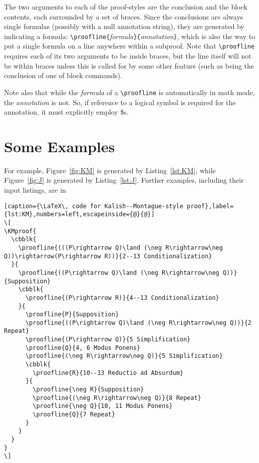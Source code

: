 \documentclass{article}
\begin{document}
The two arguments to each of the proof-styles are the conclusion and the block contents, each surrounded by a set of braces.  Since the conclusions are always single formulas (possibly with a null annotation string), they are generated by indicating a formula: \verb+\proofline{+\emph{formula}\verb+}{+\emph{annotation}\verb+}+, which is also the way to put a single formula on a line anywhere within a subproof.  Note that \verb+\proofline+ requires each of its two arguments to be inside braces, but the line itself will not be within braces unless this is called for by some other feature (such as being the conclusion of one of block commands).

Note also that while the \emph{formula} of a \verb+\proofline+ is automatically in math mode, the \emph{annotation} is not.  So, if reference to a logical symbol is required for the annotation, it must explicitly employ \$s.

\section{Some Examples}
For example, Figure~\ref{fig:KM} is generated by Listing~\ref{lst:KM}, while Figure~\ref{fig:J} is generated by Listing~\ref{lst:J}.  Further examples, including their input listings, are in {\color{red}{the other paper, again -- link to JasKMnatded.pdf}}

\begin{lstlisting}[caption={\LaTeX\, code for Kalish--Montague-style proof},label={lst:KM},numbers=left,escapeinside={@}{@}]
\[
\KMproof{
  \cbblk{  
  	\proofline{(((P\rightarrow Q)\land (\neg R\rightarrow\neg Q))\rightarrow(P\rightarrow R))}{2--13 Conditionalization}
  }{
    \proofline{((P\rightarrow Q)\land (\neg R\rightarrow\neg Q))}{Supposition}   
    \cbblk{
      \proofline{(P\rightarrow R)}{4--13 Conditionalization}
    }{
      \proofline{P}{Supposition}
      \proofline{((P\rightarrow Q)\land (\neg R\rightarrow\neg Q))}{2 Repeat}
      \proofline{(P\rightarrow Q)}{5 Simplification}
      \proofline{Q}{4, 6 Modus Ponens}
      \proofline{(\neg R\rightarrow\neg Q)}{5 Simplification}
      \cbblk{
        \proofline{R}{10--13 Reductio ad Absurdum}
      }{   
        \proofline{\neg R}{Supposition}    
        \proofline{(\neg R\rightarrow\neg Q)}{8 Repeat}
        \proofline{\neg Q}{10, 11 Modus Ponens}
        \proofline{Q}{7 Repeat}
      }
    }
  }
}
\]
\end{lstlisting}
\end{document}
